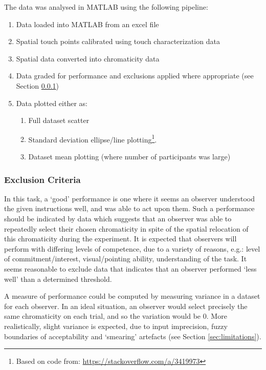 The data was analysed in \gls{MATLAB} using the following pipeline:
\begin{enumerate}
\item Data loaded into \gls{MATLAB} from an excel file
\item Spatial touch points calibrated using touch characterization data
\item Spatial data converted into chromaticity data
\item Data graded for performance and exclusions applied where appropriate (see Section \ref{sec:exclusion}) 
\item Data plotted either as:
\begin{enumerate}
\item Full dataset scatter %
\item Standard deviation ellipse/line plotting\footnote{Based on code from: \url{https://stackoverflow.com/a/3419973}}.%
\item Dataset mean plotting (where number of participants was large)%
\end{enumerate}
\end{enumerate}

\subsubsection{Exclusion Criteria} \label{sec:exclusion}

In this task, a `good' performance is one where it seems an observer understood the given instructions well, and was able to act upon them. Such a performance should be indicated by data which suggests that an observer was able to repeatedly select their chosen chromaticity in spite of the spatial relocation of this chromaticity during the experiment. It is expected that observers will perform with differing levels of competence, due to a variety of reasons, e.g.: level of commitment/interest, visual/pointing ability, understanding of the task. It seems reasonable to exclude data that indicates that an observer performed `less well' than a determined threshold.

A measure of performance could be computed by measuring variance in a dataset for each observer. In an ideal situation, an observer would select precisely the same chromaticity on each trial, and so the variation would be 0. More realistically, slight variance is expected, due to input imprecision, fuzzy boundaries of acceptability and `smearing' artefacts (see Section \ref{sec:limitations}).

